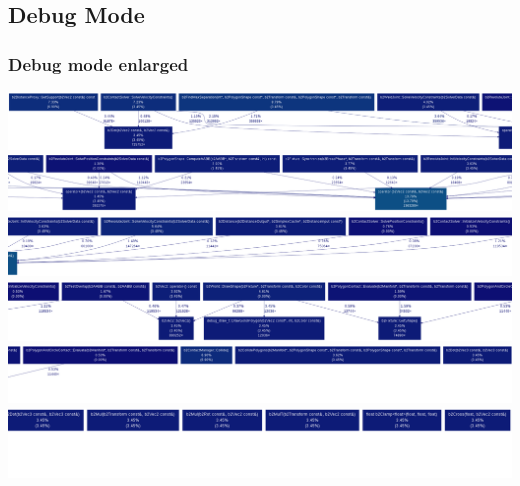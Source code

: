 \documentclass[11pt]{article}
\begin{document}
\subsection*{Debug Mode}

\subsubsection*{Debug mode enlarged}
\includegraphics[scale=0.30]{./images/dcall1.png}
\includegraphics[scale=0.30]{./images/dcall2.png}
\includegraphics[scale=0.30]{./images/dcall3.png}
\includegraphics[scale=0.30]{./images/dcall4.png}
\includegraphics[scale=0.30]{./images/dcall5.png}
\includegraphics[scale=0.30]{./images/dcall6.png}




\end{document}
